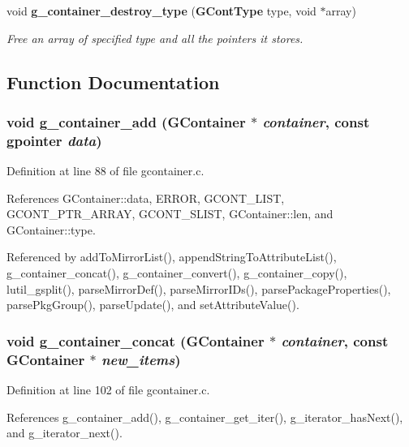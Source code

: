 \begin{CompactItemize}
void {\bf g\_\-container\_\-destroy\_\-type} ({\bf GCont\-Type} type, void $\ast$array)
\begin{CompactList}\small\item\em Free an array of specified type and all the pointers it stores. \item\end{CompactList}\end{CompactItemize}


\subsection{Function Documentation}
\subsubsection{\setlength{\rightskip}{0pt plus 5cm}void g\_\-container\_\-add ({\bf GContainer} $\ast$ {\em container}, const gpointer {\em data})}\label{gcontainer_8c_a5}




Definition at line 88 of file gcontainer.c.

References GContainer::data, ERROR, GCONT\_\-LIST, GCONT\_\-PTR\_\-ARRAY, GCONT\_\-SLIST, GContainer::len, and GContainer::type.

Referenced by add\-To\-Mirror\-List(), append\-String\-To\-Attribute\-List(), g\_\-container\_\-concat(), g\_\-container\_\-convert(), g\_\-container\_\-copy(), lutil\_\-gsplit(), parse\-Mirror\-Def(), parse\-Mirror\-IDs(), parse\-Package\-Properties(), parse\-Pkg\-Group(), parse\-Update(), and set\-Attribute\-Value().
\subsubsection{\setlength{\rightskip}{0pt plus 5cm}void g\_\-container\_\-concat ({\bf GContainer} $\ast$ {\em container}, const {\bf GContainer} $\ast$ {\em new\_\-items})}\label{gcontainer_8c_a6}




Definition at line 102 of file gcontainer.c.

References g\_\-container\_\-add(), g\_\-container\_\-get\_\-iter(), g\_\-iterator\_\-has\-Next(), and g\_\-iterator\_\-next().

